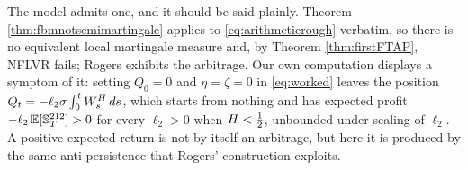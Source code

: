 \begin{remark}\label{rem:isitarbitrage}
The model admits one, and it should be said plainly. Theorem \ref{thm:fbmnotsemimartingale} applies
to \eqref{eq:arithmeticrough} verbatim, so there is no equivalent local martingale measure and, by
Theorem \ref{thm:firstFTAP}, NFLVR fails; Rogers \cite{rogers1997} exhibits the arbitrage. Our own
computation displays a symptom of it: setting $Q_0=0$ and $\eta=\zeta=0$ in \eqref{eq:worked} leaves
the position $Q_t=-\ell_2\sigma\int_0^tW^{H}_s\,d s$, which starts from nothing and has expected
profit $-\ell_2\,\mathbb{E}[\mathbb{S}^{212}_T]>0$ for every $\ell_2>0$ when $H<\tfrac12$, unbounded
under scaling of $\ell_2$. A positive expected return is not by itself an arbitrage, but here it is
produced by the same anti-persistence that Rogers' construction exploits.






\end{remark}
